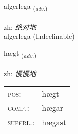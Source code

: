 \documentclass[frontgrid, backgrid]{flacards}\usepackage[]{graphicx}\usepackage[]{color}
\begin{document}

\renewcommand{\flhead}{\vskip5pt \fboxsep=0pt {\small\bfseries\footnotesize Atviksorð | 副词}}
\renewcommand{\fcfoot}{\vskip5pt \fboxsep=0pt \hspace{2pt}{\small\bfseries\footnotesize 2K}}

\renewcommand{\blhead}{\vskip5pt {\small\bfseries\footnotesize Atviksorð | 副词 }}
\renewcommand{\bcfoot}{\vskip5pt \hspace{2pt}{\small\bfseries\footnotesize 2K}}


{algerlega \small{\textsubscript{(\textit{adv.})}} \\[1ex]
\textphonetic{[alcɛrlɛɣa]} \\
zh: \emph{绝对地} \\  [2ex]
algerlega (Indeclinable)}

\renewcommand{\flhead}{\vskip5pt \fboxsep=0pt {\small\bfseries\footnotesize Atviksorð | 副词}}
\renewcommand{\fcfoot}{\vskip5pt \fboxsep=0pt \hspace{2pt}{\small\bfseries\footnotesize 2K}}

\renewcommand{\blhead}{\vskip5pt {\small\bfseries\footnotesize Atviksorð | 副词 }}
\renewcommand{\bcfoot}{\vskip5pt \hspace{2pt}{\small\bfseries\footnotesize 2K}}


{hægt \small{\textsubscript{(\textit{adv.})}} \\[1ex] %
\textphonetic{[haixt]} \\
zh: \emph{慢慢地} \\  [2ex]
\renewcommand*{\arraystretch}{0.8}
\begin{tabular}{ll}
\textsc{pos}: & hægt \\ 
\textsc{comp.}: & hægar \\ 
\textsc{superl.}: & hægast \\
\end{tabular}
}

\renewcommand{\flhead}{\vskip5pt \fboxsep=0pt {\small\bfseries\footnotesize Nafnorð | 名词}}
\renewcommand{\fcfoot}{\vskip5pt \fboxsep=0pt \hspace{2pt}{\small\bfseries\footnotesize 2K}}
\end{document}
